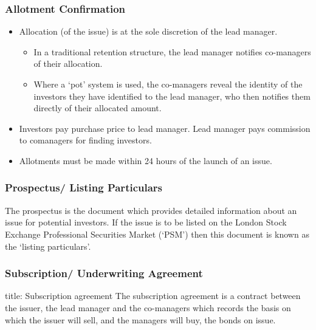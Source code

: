 \documentclass[
]{article}
\newenvironment{Shaded}{}{}
\newcommand{\NormalTok}[1]{#1}
\providecommand{\tightlist}{%
  \setlength{\itemsep}{0pt}\setlength{\parskip}{0pt}}
\begin{document}
\hypertarget{allotment-confirmation}{%
\subsubsection{Allotment Confirmation}\label{allotment-confirmation}}

\begin{itemize}
\tightlist
\item
  Allocation (of the issue) is at the sole discretion of the lead
  manager.

  \begin{itemize}
  \tightlist
  \item
    In a traditional retention structure, the lead manager notifies
    co-managers of their allocation.
  \item
    Where a `pot' system is used, the co-managers reveal the identity of
    the investors they have identified to the lead manager, who then
    notifies them directly of their allocated amount.
  \end{itemize}
\item
  Investors pay purchase price to lead manager. Lead manager pays
  commission to comanagers for finding investors.
\item
  Allotments must be made within 24 hours of the launch of an issue.
\end{itemize}

\hypertarget{prospectus-listing-particulars}{%
\subsubsection{Prospectus/ Listing
Particulars}\label{prospectus-listing-particulars}}

The prospectus is the document which provides detailed information about
an issue for potential investors. If the issue is to be listed on the
London Stock Exchange Professional Securities Market (`PSM') then this
document is known as the `listing particulars'.

\hypertarget{subscription-underwriting-agreement}{%
\subsubsection{Subscription/ Underwriting
Agreement}\label{subscription-underwriting-agreement}}

\begin{Shaded}
\begin{Highlighting}[]
\NormalTok{title: Subscription agreement }
\NormalTok{The subscription agreement is a contract between the issuer, the lead manager and the co{-}managers which records the basis on which the issuer will sell, and the managers will buy, the bonds on issue.}
\end{Highlighting}
\end{Shaded}
\end{document}
